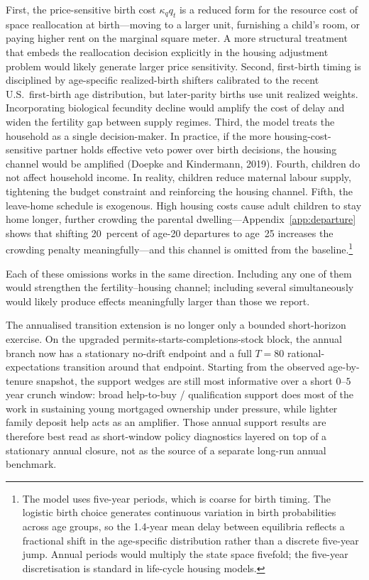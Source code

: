 \documentclass[11pt]{article}
\begin{document}
First, the price-sensitive birth cost $\kappa_q q_t$ is a reduced form for the resource cost
of space reallocation at birth---moving to a larger unit, furnishing a child's room, or
paying higher rent on the marginal square meter. A more structural treatment that embeds the
reallocation decision explicitly in the housing adjustment problem would likely generate
larger price sensitivity. Second, first-birth timing is disciplined by age-specific
realized-birth shifters calibrated to the recent U.S.\ first-birth age distribution, but
later-parity births use unit realized weights. Incorporating biological fecundity decline
would amplify the cost of delay and widen the fertility gap between supply regimes. Third,
the model treats the household as a single decision-maker. In practice, if the more
housing-cost-sensitive partner holds effective veto power over birth decisions, the housing
channel would be amplified (Doepke and Kindermann, 2019). Fourth, children do not affect
household income. In reality, children reduce maternal labour supply, tightening the budget
constraint and reinforcing the housing channel. Fifth, the leave-home schedule is exogenous.
High housing costs cause adult children to stay home longer, further crowding the parental
dwelling---Appendix~\ref{app:departure} shows that shifting 20~percent of age-20 departures
to age~25 increases the crowding penalty meaningfully---and this channel is omitted from the
baseline.\footnote{The model uses five-year periods, which is coarse for birth timing. The
logistic birth choice generates continuous variation in birth probabilities across age groups,
so the 1.4-year mean delay between equilibria reflects a fractional shift in the age-specific
distribution rather than a discrete five-year jump. Annual periods would multiply the state
space fivefold; the five-year discretisation is standard in life-cycle housing models.}

Each of these omissions works in the same direction. Including any one of them would
strengthen the fertility--housing channel; including several simultaneously would likely
produce effects meaningfully larger than those we report.

The annualised transition extension is no longer only a bounded short-horizon exercise. On
the upgraded permits-starts-completions-stock block, the annual branch now has a stationary
no-drift endpoint and a full $T=80$ rational-expectations transition around that endpoint.
Starting from the observed age-by-tenure snapshot, the support wedges are still most
informative over a short $0$--$5$ year crunch window: broad help-to-buy / qualification
support does most of the work in sustaining young mortgaged ownership under pressure, while
lighter family deposit help acts as an amplifier. Those annual support results are therefore
best read as short-window policy diagnostics layered on top of a stationary annual closure,
not as the source of a separate long-run annual benchmark.
\end{document}
